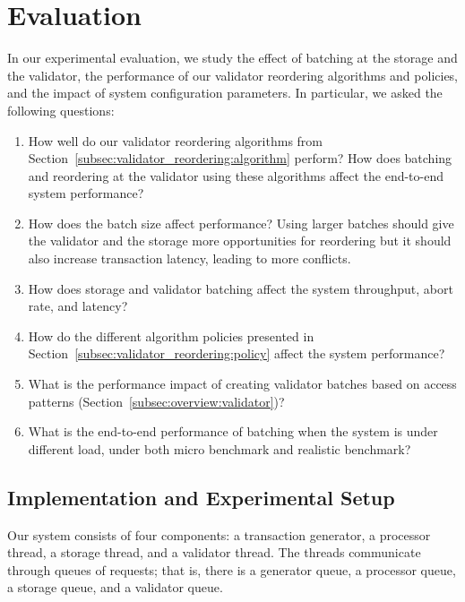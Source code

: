 \section{Evaluation}\label{sec:experiments}
In our experimental evaluation, we study the effect of batching at the storage and the validator, the performance of our validator reordering algorithms and policies, and the impact of system configuration parameters. In particular, we asked the following questions:
\begin{enumerate}
\item\vspace{-.5em} How well do our validator reordering algorithms from Section~\ref{subsec:validator_reordering:algorithm} perform? How does batching and reordering at the validator using these algorithms affect the end-to-end system performance?
\item\vspace{-.5em} How does the batch size affect performance? Using larger batches should give the validator and the storage more opportunities for reordering but it should also increase transaction latency, leading to more conflicts. 
\item\vspace{-.5em} How does storage and validator batching affect the system throughput, abort rate, and latency?
\item\vspace{-.5em} How do the different algorithm policies presented in Section~\ref{subsec:validator_reordering:policy} affect the system performance?
\item\vspace{-.5em} What is the performance impact of creating validator batches based on access patterns (Section~\ref{subsec:overview:validator})?
\item\vspace{-.5em} What is the end-to-end performance of batching when the system is under different load, under both micro benchmark and realistic benchmark?
\end{enumerate}

\subsection{Implementation and Experimental Setup}
\label{subsec:experiment:implementation}

Our system consists of four components: a transaction generator, a processor thread, a storage thread, and a validator thread. The threads communicate through queues of requests; that is, there is a generator queue, a processor queue, a storage queue, and a validator queue.

